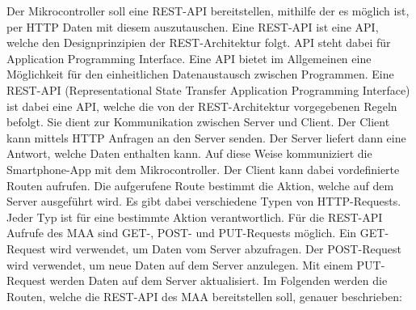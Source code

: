 \documentclass[11pt, twoside]{article}
\begin{document}
Der Mikrocontroller soll eine REST-API bereitstellen, mithilfe der es möglich ist, per HTTP Daten mit diesem auszutauschen. Eine REST-API ist eine API, welche den Designprinzipien der REST-Architektur folgt. API steht dabei für \glqq Application Programming Interface\grqq{}. Eine API bietet im Allgemeinen eine Möglichkeit für den einheitlichen Datenaustausch zwischen Programmen. Eine REST-API (Representational State Transfer Application Programming Interface) ist dabei eine API, welche die von der REST-Architektur vorgegebenen Regeln befolgt. Sie dient  zur Kommunikation zwischen Server und Client. Der Client kann mittels HTTP Anfragen an den Server senden. Der Server liefert dann eine Antwort, welche Daten enthalten kann. \parencite[vgl.][]{noauthor_urlpi04_nodate} Auf diese Weise kommuniziert die Smartphone-App mit dem Mikrocontroller. Der Client kann dabei vordefinierte Routen aufrufen. Die aufgerufene Route bestimmt die Aktion, welche auf dem Server ausgeführt wird. Es gibt dabei verschiedene Typen von HTTP-Requests. Jeder Typ ist für eine bestimmte Aktion verantwortlich. Für die REST-API Aufrufe des MAA sind GET-, POST- und PUT-Requests möglich. Ein GET-Request wird verwendet, um Daten vom Server abzufragen. Der POST-Request wird verwendet, um neue Daten auf dem Server anzulegen. Mit einem PUT-Request werden Daten auf dem Server aktualisiert. \parencite[vgl.][]{noauthor_urlpi13_nodate} Im Folgenden werden die Routen, welche die REST-API des MAA bereitstellen soll, genauer beschrieben: \newline \\
\end{document}
